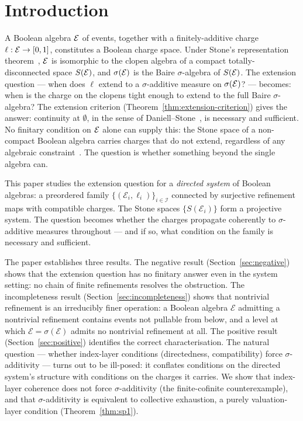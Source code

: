 \section{Introduction}

A Boolean algebra $\mathcal{E}$ of events, together with a finitely-additive charge
$\ell : \mathcal{E} \to [0,1]$, constitutes a Boolean charge space.
Under Stone's representation theorem~\cite{Stone1936}, $\mathcal{E}$ is isomorphic to the
clopen algebra of a compact totally-disconnected space $S(\mathcal{E})$, and $\sigma(\mathcal{E})$ is
the Baire $\sigma$-algebra of $S(\mathcal{E})$.  The extension question --- when does $\ell$
extend to a $\sigma$-additive measure on $\sigma(\mathcal{E})$? --- becomes: when is the
charge on the clopens tight enough to extend to the full Baire $\sigma$-algebra?
The extension criterion (Theorem~\ref{thm:extension-criterion}) gives the answer:
continuity at $\emptyset$, in the sense of Daniell--Stone~\cite{Daniell1918,Stone1948},
is necessary and sufficient.  No finitary condition on $\mathcal{E}$ alone can supply this:
the Stone space of a non-compact Boolean algebra carries charges that do not extend,
regardless of any algebraic constraint~\cite{deFinetti1974}.  The question is
whether something beyond the single algebra can.

This paper studies the extension question for a \emph{directed system} of Boolean
algebras: a preordered family $\{(\mathcal{E}_i, \ell_i)\}_{i \in \mathcal{I}}$
connected by surjective refinement maps with compatible charges.  The Stone spaces
$\{S(\mathcal{E}_i)\}$ form a projective system.  The question becomes whether the
charges propagate coherently to $\sigma$-additive measures throughout --- and if so,
what condition on the family is necessary and sufficient.

The paper establishes three results.  The negative result (Section~\ref{sec:negative})
shows that the extension question has no finitary answer even in the system setting:
no chain of finite refinements resolves the obstruction.
The incompleteness result (Section~\ref{sec:incompleteness}) shows that nontrivial
refinement is an irreducibly finer operation: a Boolean algebra $\mathcal{E}$ admitting
a nontrivial refinement contains events not pullable from below, and a level at which
$\mathcal{E} = \sigma(\mathcal{E})$ admits no nontrivial refinement at all.  The
positive result (Section~\ref{sec:positive}) identifies the correct characterisation.
The natural question --- whether index-layer conditions (directedness, compatibility)
force $\sigma$-additivity --- turns out to be ill-posed: it conflates conditions on
the directed system's structure with conditions on the charges it carries.  We show that
index-layer coherence does not force $\sigma$-additivity (the finite-cofinite
counterexample), and that $\sigma$-additivity is equivalent to collective exhaustion,
a purely valuation-layer condition (Theorem~\ref{thm:sp1}).

